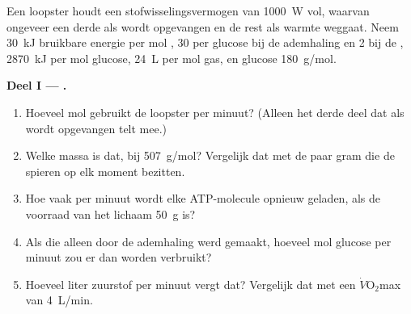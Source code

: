 \begin{problem}
\label{pb:g12:respiration-fermentation:1}
Een loopster houdt een stofwisselingsvermogen van \qty{1000}{W} vol,
waarvan ongeveer een derde als  wordt opgevangen en de rest als warmte
weggaat. Neem \qty{30}{kJ} bruikbare energie per mol , 30  per
glucose bij de ademhaling en 2 bij de , \qty{2870}{kJ} per mol
glucose, \qty{24}{L} per mol gas, en glucose \qty{180}{g/mol}.

\medskip
\noindent\textbf{Deel I --- .}
\begin{enumerate}
  \item Hoeveel mol  gebruikt de loopster per minuut? (Alleen het derde
        deel dat als  wordt opgevangen telt mee.)
  \item Welke massa  is dat, bij \qty{507}{g/mol}? Vergelijk dat met de
        paar gram die de spieren op elk moment bezitten.
  \item Hoe vaak per minuut wordt elke ATP-molecule opnieuw geladen, als
        de voorraad van het lichaam \qty{50}{g} is?
  \item Als die  alleen door de ademhaling werd gemaakt, hoeveel mol
        glucose per minuut zou er dan worden verbruikt?
  \item Hoeveel liter zuurstof per minuut vergt dat? Vergelijk dat met een
        $\dot V\!\mathrm{O_2}$max van \qty{4}{L/min}.
\end{enumerate}


\end{problem}
